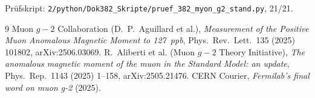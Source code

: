 \medskip\noindent Prüfskript: \texttt{2/python/Dok382\_Skripte/pruef\_382\_myon\_g2\_stand.py}, 21/21.

\begin{thebibliography}{9}
 Muon $g-2$ Collaboration (D.~P.~Aguillard et al.),
  \emph{Measurement of the Positive Muon Anomalous Magnetic Moment to 127~ppb},
  Phys.\ Rev.\ Lett.\ 135 (2025) 101802, arXiv:2506.03069.
 R.~Aliberti et al. (Muon $g-2$ Theory Initiative),
  \emph{The anomalous magnetic moment of the muon in the Standard Model: an update},
  Phys.\ Rep.\ 1143 (2025) 1--158, arXiv:2505.21476.
 CERN Courier, \emph{Fermilab's final word on muon g-2} (2025).
\end{thebibliography}
